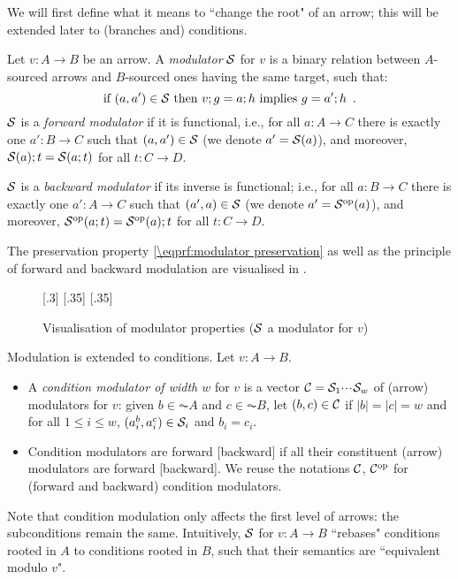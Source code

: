 We will first define what it means to ``change the root" of an arrow; this will be extended later to (branches and) conditions.
%
\begin{definition}[modulator]
Let $v:A\to B$ be an arrow. A \emph{modulator} $\mathcal{S}$ for $v$ is a binary relation between $A$-sourced arrows and $B$-sourced ones having the same target, such that:
%
\begin{equation}\eqlabel{modulator preservation}
\text{if } (a,a')\in \cM \text{ then } v;g=a;h \text{ implies } g=a';h \enspace.
\end{equation}
%
$\mathcal{S}$ is a \emph{forward modulator} if it is functional, i.e., for all $a:A\to C$ there is exactly one $a':B\to C$ such that $(a,a')\in \mathcal{S}$ (we denote $a'={\mathcal{S}}(a)$), and moreover, ${\mathcal{S}}(a);t={\mathcal{S}}(a;t)$ for all $t:C\to D$.

$\mathcal{S}$ is a \emph{backward modulator} if its inverse is functional; i.e., for all $a:B\to C$ there is exactly one $a':A\to C$ such that $(a',a)\in \mathcal{S}$ (we denote $a'={\mathcal{S}}^{\mathrm{op}}(a)$), and moreover, ${\mathcal{S}}^{\mathrm{op}}(a;t)={\mathcal{S}}^{\mathrm{op}}(a);t$ for all $t:C\to D$.
\end{definition}
%
The preservation property \eqref{\eqprf:modulator preservation} as well as the principle of forward and backward modulation are visualised in .
%
\begin{figure}
\centering
{}[.3\textwidth]
              {}%
[.35\textwidth]{}%
[.35\textwidth]{}%
\caption{Visualisation of modulator properties ($\mathcal{S}$ a modulator for $v$)}
\end{figure}

Modulation is extended to conditions. Let $v:A\to B$.
%
\begin{itemize}
\item A \emph{condition modulator of width $w$} for $v$ is a vector $\mathcal{C}=\mathcal{S}_1{\cdotp\mkern-2mu\cdotp\mkern-2mu\cdotp\mkern1mu} \mathcal{S}_w$ of (arrow) modulators for $v$: given $b\in \AC A$ and $c\in \AC B$, let $(b,c)\in \mathcal{C}$ if $|b|=|c|=w$ and for all $1\leq i\leq w$, $(a^b_i,a^c_i)\in \mathcal{S}_i$ and $b_i=c_i$.
\item Condition modulators are forward [backward] if all their constituent (arrow) modulators are forward [backward]. We reuse the notations ${\mathcal{C}}$, ${\mathcal{C}}^{\mathrm{op}}$ for (forward and backward) condition modulators.
\end{itemize}
%
Note that condition modulation only affects the first level of arrows: the subconditions remain the same. Intuitively, $\mathcal{S}$ for $v:A\to B$ ``rebases" conditions rooted in $A$ to conditions rooted in $B$, such that their semantics are ``equivalent modulo $v$". 

